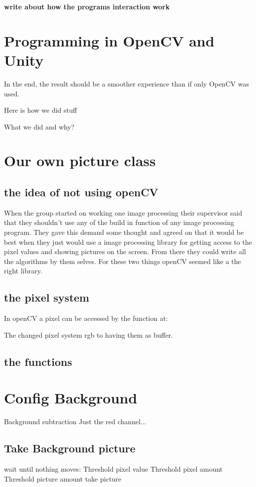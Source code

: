 \textbf{write about how the programs interaction work}
\section{Programming in OpenCV and Unity}

In the end, the result should be a smoother experience than if only OpenCV was used.

Here is how we did stuff

What we did and why?

\section{Our own picture class}

\subsection{the idea of not using openCV}
When the group started on working one image processing their supervisor said that they shouldn't use any of the build in function of any image processing program. They gave this demand some thought and agreed on that it would be best when they just would use a image processing library for getting access to the pixel values and showing pictures on the screen. From there they could write all the algorithms by them selves. For these two things openCV seemed like a the right library.
\subsection{the pixel system}
In openCV a pixel can be accessed by the function at:



	The changed pixel system rgb to having them as buffer. 
\subsection{the functions}

\section{Config Background}
Background subtraction
Just the red channel...
\subsection{Take Background picture}
wait until nothing moves:
	Threshold pixel value
	Threshold pixel amount
	Threshold picture amount
take picture
